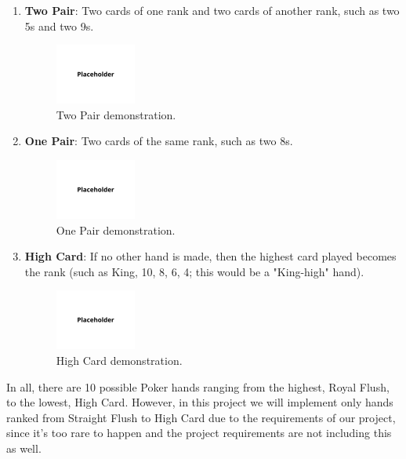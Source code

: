 \begin{enumerate}
\begin{figure}[H]
        \label{fig:three-of-a-kind}
    \end{figure}
    \item \textbf{Two Pair}: Two cards of one rank and two cards of another rank, such as two 5s and two 9s.
    \begin{figure}[H]
        \centering
        \includegraphics[width=0.25\textwidth]{figures/placeholder.png}
        \caption{Two Pair demonstration.}
        \label{fig:two-pair}
    \end{figure}
    \item \textbf{One Pair}: Two cards of the same rank, such as two 8s.
    \begin{figure}[H]
        \centering
        \includegraphics[width=0.25\textwidth]{figures/placeholder.png}
        \caption{One Pair demonstration.}
        \label{fig:one-pair}
    \end{figure}
    \item \textbf{High Card}: If no other hand is made, then the highest card played becomes the rank (such as King, 10, 8, 6, 4; this would be a "King-high" hand).
    \begin{figure}[H]
        \centering
        \includegraphics[width=0.25\textwidth]{figures/placeholder.png}
        \caption{High Card demonstration.}
        \label{fig:high-card}
    \end{figure}
\end{enumerate}

\hspace{1cm} In all, there are 10 possible Poker hands ranging from the highest, Royal Flush, to the lowest, High Card. However, in this project we will implement only hands ranked from Straight Flush to High Card due to the requirements of our project, since it's too rare to happen and the project requirements are not including this as well.

